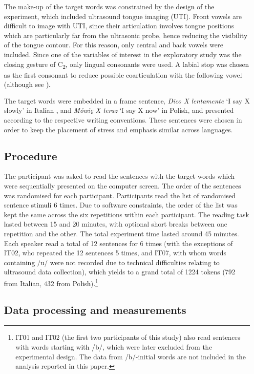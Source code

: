 \documentclass[preprint]{JASAnew}
\begin{document}
The make-up of the target words was constrained by the design of the
experiment, which included ultrasound tongue imaging (UTI). Front vowels
are difficult to image with UTI, since their articulation involves
tongue positions which are particularly far from the ultrasonic probe,
hence reducing the visibility of the tongue contour. For this reason,
only central and back vowels were included. Since one of the variables
of interest in the exploratory study was the closing gesture of
C\textsubscript{2}, only lingual consonants were used. A labial stop was
chosen as the first consonant to reduce possible coarticulation with the
following vowel (although see \citealt{vazquez-alvarez2007}).

The target words were embedded in a frame sentence, \emph{Dico X
lentamente} `I say X slowly' in Italian \citep[following][]{hajek2008},
and \emph{Mówię X teraz} `I say X now' in Polish, and presented
according to the respective writing conventions. These sentences were
chosen in order to keep the placement of stress and emphasis similar
across languages.

\hypertarget{procedure}{%
\subsection{Procedure}\label{procedure}}

The participant was asked to read the sentences with the target words
which were sequentially presented on the computer screen. The order of
the sentences was randomised for each participant. Participants read the
list of randomised sentence stimuli 6 times. Due to software
constraints, the order of the list was kept the same across the six
repetitions within each participant. The reading task lasted between 15
and 20 minutes, with optional short breaks between one repetition and
the other. The total experiment time lasted around 45 minutes. Each
speaker read a total of 12 sentences for 6 times (with the exceptions of
IT02, who repeated the 12 sentences 5 times, and IT07, with whom words
containing /u/ were not recorded due to technical difficulties relating
to ultrasound data collection), which yields to a grand total of 1224
tokens (792 from Italian, 432 from
Polish).\footnote{IT01 and IT02 (the first two participants of this study) also read sentences with words starting with /b/, which were later excluded from the experimental design. The data from /b/-initial words are not included in the analysis reported in this paper.}

\hypertarget{data-processing-and-measurements}{%
\subsection{Data processing and
measurements}\label{data-processing-and-measurements}}
\end{document}
